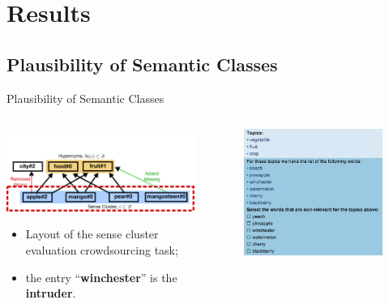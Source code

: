 \documentclass[usenames,dvipsnames]{beamer}
\begin{document}
\section{Results}
\subsection{Plausibility of Semantic Classes}

\begin{frame}{Plausibility of Semantic Classes}

\begin{columns}
\begin{column}{0.4\textwidth}

\includegraphics[width=1.0\textwidth]{figures/e1}

\pause

 \begin{itemize}
\item Layout of the sense cluster evaluation crowdsourcing task;
 
 \item the entry ``\textbf{\alert{winchester}}'' is the \textbf{intruder}.
\end{itemize}
\end{column}
\begin{column}{0.6\textwidth}  

\begin{figure}
  \centering
  \includegraphics[width=.99\textwidth]{figures/cluster-hit}
\end{figure}


\end{column}
\end{columns}
\end{frame}
\end{document}
